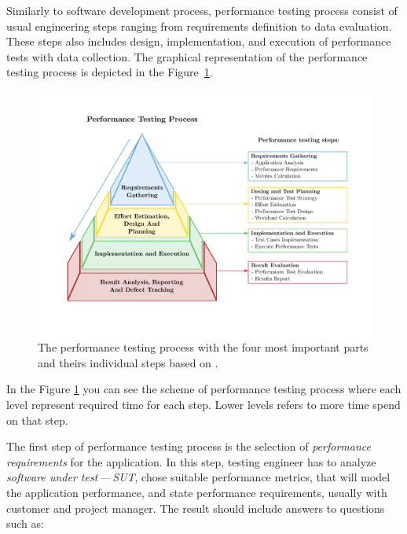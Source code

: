 
Similarly to software development process, performance testing process consist of usual engineering steps ranging from requirements definition to data evaluation. These steps also includes design, implementation, and execution of performance tests with data collection. The graphical representation of the performance testing process is depicted in the Figure~\ref{fig:performace_testing_process}.

\begin{figure}[H]
  \includegraphics[width=16cm]{obrazky-figures/pyramid.pdf}
  \caption{The performance testing process with the four most important parts and theirs individual steps based on \cite{Sharma:HP}.}
  \label{fig:performace_testing_process}
\end{figure}
In the Figure \ref{fig:performace_testing_process} you can see the scheme of performance testing process where each level represent required time for each step. Lower levels refers to more time spend on that step.

The first step of performance testing process is the selection of \emph{performance requirements} for the application. In this step, testing engineer has to analyze \emph{software under test\,---\,SUT}, chose suitable performance metrics, that will model the application performance, and state performance requirements, usually with customer and project manager. The result should include answers to questions such as:

